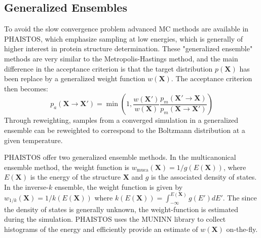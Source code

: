 \subsection{Generalized Ensembles}
To avoid the slow convergence problem advanced MC methods are available in PHAISTOS, which emphasize sampling at low energies, which is generally of higher interest in protein structure determination.
These "generalized ensemble" methods are very similar to the Metropolis-Hastings method, and the main difference in the acceptance criterion is that the target distribution $p(\mathbf{X})$ has been replace by a generalized weight function $w(\mathbf{X})$. 
The acceptance criterion then becomes:
\begin{equation}
    \label{eq:mc_gh}
    p_a(\mathbf{X} \rightarrow \mathbf{X'}) = \min \left( 1,
    \frac{w(\mathbf{X'})}
         {w(\mathbf{X})}
    \frac{p_m(\mathbf{X'} \rightarrow \mathbf{X})}
         {p_m(\mathbf{X} \rightarrow \mathbf{X'})} \right)
\end{equation}
Through reweighting, samples from a converged simulation in a generalized ensemble can be reweighted to correspond to the Boltzmann distribution at a given temperature.

PHAISTOS offer two generalized ensemble methods.
In the multicanonical ensemble method, the weight function is $w_\mathrm{muca}(\mathbf{X}) = 1/g(E(\mathbf{X}))$, where $E(\mathbf{X})$ is the energy of the structure $\mathbf{X}$ and $g$ is the associated density of states.
In the inverse-$k$ ensemble, the weight function is given by $w_\textit{1/k}(\mathbf{X}) = 1/k(E(\mathbf{X}))$ where $k(E(\mathbf{X})) = \int_{-\infty}^{E(\mathbf{X})} g(E') dE'$.
The since the density of states is generally unknown, the weight-function is estimated during the simulation.
PHAISTOS uses the MUNINN library to collect histograms of the energy and efficiently provide an estimate of $w(\mathbf{X})$ on-the-fly.



